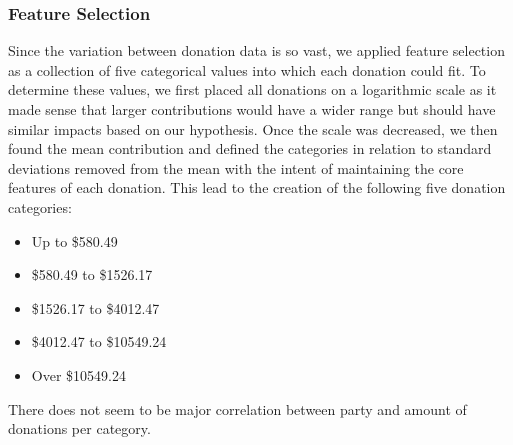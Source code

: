 \documentclass[journal]{IEEEtran}
\begin{document}
 \subsubsection{Feature Selection} 
 Since the variation between donation data is so vast, we applied feature selection as a collection of five
 categorical values into which each donation could fit. To determine these values, we first placed all donations on a logarithmic scale
 as it made sense that larger contributions would have a wider range but should have similar impacts based on our hypothesis. Once
 the scale was decreased, we then found the mean contribution and defined the categories in relation to standard deviations removed 
 from the mean with the intent of maintaining the core features of each donation. This lead to the creation of the following five 
 donation categories:
 \begin{itemize}
  \item Up to \$580.49
  \item \$580.49 to \$1526.17
  \item \$1526.17 to \$4012.47
  \item \$4012.47 to \$10549.24
  \item Over \$10549.24
 \end{itemize}
 There does not seem to be major correlation between party and amount of donations per category\footnotemark.\\
\end{document}
